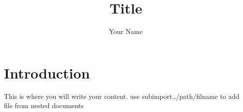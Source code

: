 \documentclass{article}
\title{Title}
\author{Your Name}
\begin{document}
\maketitle{}
\section{Introduction}
This is where you will write your content.
use \/subimport{../path/}{filname} to add file from nested documents
\end{document}
